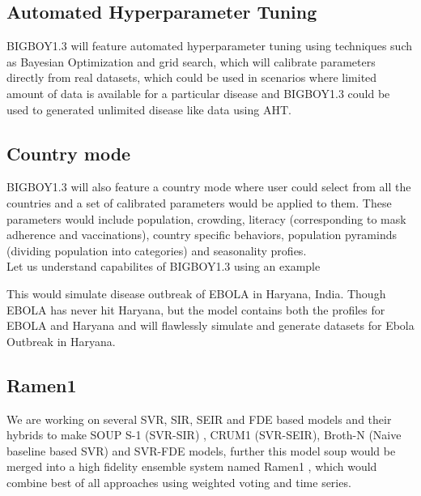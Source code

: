 \documentclass[11pt,a4paper]{article}
\theoremstyle{remark}\newtheorem{remark}{Remark}
\begin{document}
\subsection{Automated Hyperparameter Tuning}
BIGBOY1.3 will feature automated hyperparameter tuning using techniques such as Bayesian Optimization and grid search, which will calibrate parameters directly from real datasets, which could be used in scenarios where limited amount of data is available for a particular disease and BIGBOY1.3 could be used to generated unlimited disease like data using AHT. 
\subsection{Country mode}
BIGBOY1.3 will also feature a country mode where user could select from all the countries and a set of calibrated parameters would be applied to them. These parameters would include population, crowding, literacy (corresponding to mask adherence and vaccinations), country specific behaviors, population pyraminds (dividing population into categories) and seasonality profies. \\
Let us understand capabilites of BIGBOY1.3 using an example
\begin{center}
\end{center}
This would simulate disease outbreak of EBOLA in Haryana, India. Though EBOLA has never hit Haryana, but the model contains both the profiles for EBOLA and Haryana and will flawlessly simulate and generate datasets for Ebola Outbreak in Haryana.
\subsection{Ramen1}
We are working on several SVR, SIR, SEIR and FDE based models and their hybrids to make SOUP S-1 (SVR-SIR) , CRUM1 (SVR-SEIR), Broth-N (Naive baseline based SVR) and SVR-FDE models, further this model soup would be merged into a high fidelity ensemble system named Ramen1 , which would combine best of all approaches using weighted voting and time series. 
\end{document}

